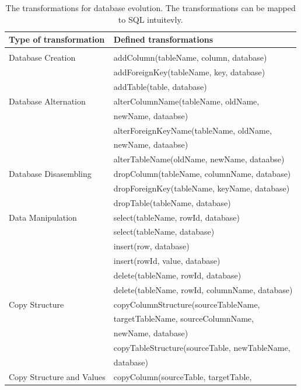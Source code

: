 \documentclass[runningheads]{comsis}
\begin{document}
\begin{table}
\caption{The transformations for database evolution. The transformations can be mapped to SQL intuitevly.}
	\label{tab:db-basic-evolution}
\centering
\setlength\tabcolsep{0.5em}
	\begin{tabular}{ll}
	\hline
	Type of transformation & Defined transformations \\
	\hline
	\\[-2ex] Database Creation
	& addColumn(tableName, column, database) \\
	& addForeignKey(tableName, key, database) \\
	& addTable(table, database)\\
	Database Alternation
	& alterColumnName(tableName, oldName, \\ & \hspace{0.5in}newName, dataabse) \\
	& alterForeignKeyName(tableName, oldName, \\ & \hspace{0.5in}newName, dataabse) \\
	& alterTableName(oldName, newName, dataabse) \\
	Database Disasembling
	& dropColumn(tableName, columnName, database) \\
	& dropForeignKey(tableName, keyName, database) \\
	& dropTable(tableName, database) \\
	Data Manipulation
	& select(tableName, rowId, database) \\
	& select(tableName, database) \\
	& insert(row, database) \\
	& insert(rowId, value, database) \\
	& delete(tableName, rowId, database) \\
	& delete(tableName, rowId, columnName, database) \\
	Copy Structure
	& copyColumnStructure(sourceTableName,\\ &  \hspace{0.5in} targetTableName,  sourceColumnName, \\ &  \hspace{0.5in} newName, database) \\
	& copyTableStructure(sourceTable, newTableName, \\ &  \hspace{0.5in} database) \\
	Copy Structure and Values
	& copyColumn(sourceTable, targetTable, \\

\end{tabular}
\end{table}
\end{document}
